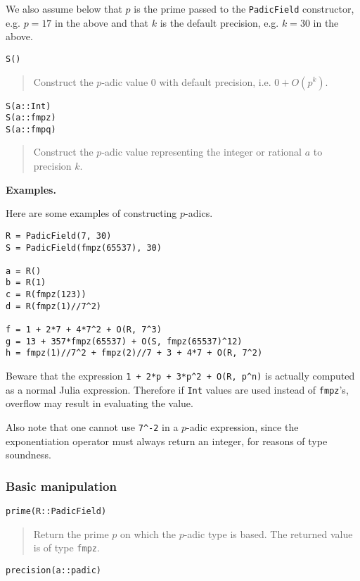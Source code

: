 \documentclass[a4paper,10pt]{article}
\newcommand{\code}{\lstinline}
\newcommand{\desc}[1]{\vspace{-3mm}\begin{quote}#1\end{quote}}
\begin{document}
{{We also assume below that $p$ is the prime passed to the \code{PadicField}
constructor, e.g. $p = 17$ in the above and that $k$ is the default precision,
e.g. $k = 30$ in the above.

\begin{lstlisting}
S()
\end{lstlisting}

\desc{Construct the $p$-adic value $0$ with default precision, i.e. $0 + O(p^k)$.}

\begin{lstlisting}
S(a::Int)
S(a::fmpz)
S(a::fmpq)
\end{lstlisting}

\desc{Construct the $p$-adic value representing the integer or rational $a$ to
precision $k$.}

\textbf{Examples.}

Here are some examples of constructing $p$-adics.

\begin{lstlisting}
R = PadicField(7, 30)
S = PadicField(fmpz(65537), 30)

a = R()
b = R(1)
c = R(fmpz(123))
d = R(fmpz(1)//7^2)

f = 1 + 2*7 + 4*7^2 + O(R, 7^3)
g = 13 + 357*fmpz(65537) + O(S, fmpz(65537)^12)
h = fmpz(1)//7^2 + fmpz(2)//7 + 3 + 4*7 + O(R, 7^2)
\end{lstlisting}

Beware that the expression \code{1 + 2*p + 3*p^2 + O(R, p^n)} is actually computed as
a normal Julia expression. Therefore if \code{Int} values are used instead of
\code{fmpz}'s, overflow may result in evaluating the value.

Also note that one cannot use \code{7^-2} in a $p$-adic expression, since the 
exponentiation operator must always return an integer, for reasons of type soundness.

\subsubsection{Basic manipulation}

\begin{lstlisting}
prime(R::PadicField)
\end{lstlisting}

\desc{Return the prime $p$ on which the $p$-adic type is based. The returned
value is of type \code{fmpz}.}

\begin{lstlisting}
precision(a::padic)
\end{lstlisting}

}}
\end{document}
